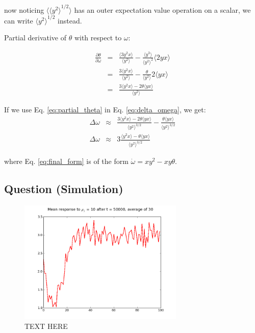 now noticing $\langle {\langle y^2 \rangle}^{1/2} \rangle$ has an outer expectation value operation on a scalar, we can write $ {\langle y^2 \rangle}^{1/2} $ instead.

Partial derivative of $\theta$ with respect to $\omega$:

\begin{eqnarray}
\frac{\partial \theta}{\partial \omega} &=& \frac{\langle 3y^2 x\rangle}{\langle y^2 \rangle}  - \frac{\langle y^3\rangle}{\langle y^2\rangle^2} \langle 2yx\rangle \\
 &=& \frac{3\langle y^2 x\rangle}{\langle y^2 \rangle}  - \frac{\theta}{\langle y^2\rangle} 2\langle yx\rangle \\
 &=& \frac{3\langle y^2 x\rangle-2\theta\langle yx\rangle}{\langle y^2 \rangle}  \label{eq:partial_theta}
\end{eqnarray}

If we use Eq. \ref{eq:partial_theta} in Eq. \ref{eq:delta_omega}, we get: 
\begin{eqnarray}
\Delta \omega&\approx&  \frac{3\langle y^2 x\rangle-2\theta\langle yx\rangle}{\langle y^2 \rangle^{3/2}}   -  \frac{\theta \langle y x \rangle}  {\langle y^2 \rangle^{3/2}} \\
\Delta \omega&\approx&  3\frac{\langle y^2 x\rangle-\theta\langle yx\rangle}{\langle y^2 \rangle^{3/2}}  \label{eq:final_form} 
\end{eqnarray}

where Eq. \ref{eq:final_form} is of the form $\dot\omega =  xy^2 - xy\theta$.
\newpage
\subsection{Question (Simulation)}

\begin{figure}[h]
\centering
\includegraphics[width=0.7\textwidth]{../ex2/weights_mu10_t50k_mean.png}
\caption{TEXT HERE}
\label{fig:mu10}
\end{figure}

